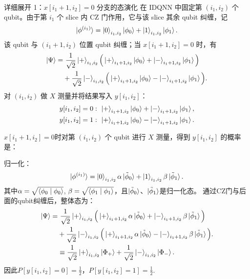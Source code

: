 \documentclass[aspectratio=169]{beamer}
\begin{document}
\begin{frame}{详细展开 1：\(x[i_1+1,i_2]=0\) 分支的态演化}
  \small
  在 IDQNN 中固定第 \((i_1,i_2)\) 个 qubit。由于第 \(i_1\) 个 slice 内 CZ 门作用，它与该 slice 其余 qubit 纠缠，记
  \[
    \ket{\phi^{(i_1)}}=
    \ket{0}_{i_1,i_2}\ket{\phi_0}+\ket{1}_{i_1,i_2}\ket{\phi_1}.
  \]
  该 qubit 与 \((i_1+1,i_2)\) 位置 qubit 纠缠；当 \(x[i_1+1,i_2]=0\) 时，有
  \[
  \begin{aligned}
    \ket{\Psi}
    =&~\frac{1}{\sqrt{2}}\ket{+}_{i_1,i_2}
      \Big(\ket{+}_{i_1+1,i_2}\ket{\phi_0}
      +\ket{-}_{i_1+1,i_2}\ket{\phi_1}\Big) \\
    &+\frac{1}{\sqrt{2}}\ket{-}_{i_1,i_2}
      \Big(\ket{+}_{i_1+1,i_2}\ket{\phi_0}
      -\ket{-}_{i_1+1,i_2}\ket{\phi_1}\Big).
  \end{aligned}
  \]
  对 \((i_1,i_2)\) 做 \(X\) 测量并将结果写入 \(y[i_1,i_2]\)：
  \[
  \begin{aligned}
    y[i_1,i_2]=0 &:~ \ket{+}_{i_1+1,i_2}\ket{\phi_0}+\ket{-}_{i_1+1,i_2}\ket{\phi_1},\\
    y[i_1,i_2]=1 &:~ \ket{+}_{i_1+1,i_2}\ket{\phi_0}-\ket{-}_{i_1+1,i_2}\ket{\phi_1}.
  \end{aligned}
  \]
\end{frame}
\begin{frame}
  $x[i_1+1,i_2]=0$时对第 \((i_1,i_2)\) 个 qubit 进行 \(X\) 测量，得到 \(y[i_1,i_2]\) 的概率是：

  归一化：
  \[
    \ket{\phi^{(i_1)}}=
    \ket{0}_{i_1,i_2}\alpha\ket{\tilde{\phi}_0}
    +\ket{1}_{i_1,i_2}\beta\ket{\tilde{\phi}_1}.
  \]
  其中$\alpha=\sqrt{\braket{\phi_0\mid\phi_0}}$, $\beta=\sqrt{\braket{\phi_1\mid\phi_1}}$，且$\ket{\tilde{\phi}_0}$、$\ket{\tilde{\phi}_1}$是归一化态。
  通过CZ门与后面的qubit纠缠后，整体态为：
  \[
  \begin{aligned}
    \ket{\Psi}
    =&~\frac{1}{\sqrt{2}}\ket{+}_{i_1,i_2}
      \Big(\ket{+}_{i_1+1,i_2}\alpha\ket{\tilde{\phi}_0}
      +\ket{-}_{i_1+1,i_2}\beta\ket{\tilde{\phi}_1}\Big) \\
    &+\frac{1}{\sqrt{2}}\ket{-}_{i_1,i_2}
      \Big(\ket{+}_{i_1+1,i_2}\alpha\ket{\tilde{\phi}_0}
      -\ket{-}_{i_1+1,i_2}\beta\ket{\tilde{\phi}_1}\Big).\\
    &\equiv\frac{1}{\sqrt{2}}\ket{+}_{i_1,i_2}\ket{\Phi_+}
      +\frac{1}{\sqrt{2}}\ket{-}_{i_1,i_2}\ket{\Phi_-}.
  \end{aligned}
  \]
  因此$P[y[i_1,i_2]=0]=\frac{1}{2}$，$P[y[i_1,i_2]=1]=\frac{1}{2}$.
\end{frame}
\end{document}
